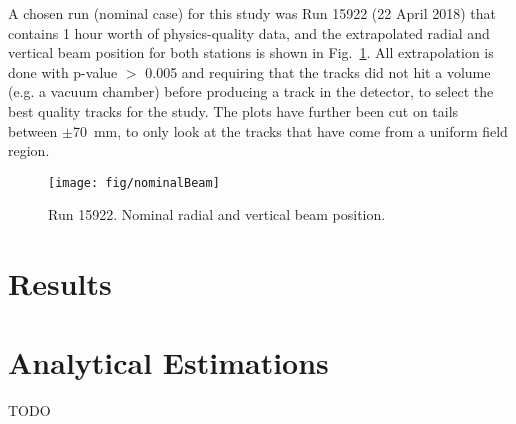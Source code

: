 \documentclass[a4paper,11pt]{article}
\begin{document}
A chosen run (nominal case) for this study was Run 15922 (22 April 2018) that contains 1 hour worth of physics-quality data, and the extrapolated radial and vertical beam position for both stations is shown in Fig.~\ref{fig:nominalBeam}. All extrapolation is done with p-value $>$ 0.005 and requiring that the tracks did not hit a volume (e.g. a vacuum chamber) before producing a track in the detector, to select the best quality tracks for the study. The plots have further been cut on tails between $\pm$\SI{70}{\milli\metre}, to only look at the tracks that have come from a uniform field region.


\begin{figure}[ht!]
    \centering
    \texttt{[image: fig/nominalBeam]}
    \vspace{-8pt}
    \caption{Run 15922. Nominal radial and vertical beam position.}
    \label{fig:nominalBeam}
\end{figure}


\section{Results}



\section{Analytical Estimations}
TODO 


\clearpage


\nocite{*}
\thispagestyle{plain}

\end{document}
